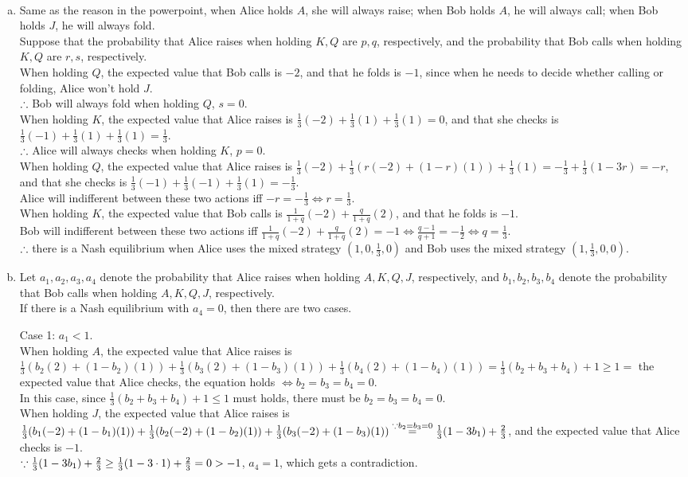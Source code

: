 \begin{pr}$ $
\begin{enumerate}[(a)]
\item Same as the reason in the powerpoint, when Alice holds $A$, she will always raise; when Bob holds $A$, he will always call; when Bob holds $J$, he will always fold.\\
Suppose that the probability that Alice raises when holding $K, Q$ are $p, q$, respectively, and the probability that Bob calls when holding $K, Q$ are $r, s$, respectively.\\
When holding $Q$, the expected value that Bob calls is $-2$, and that he folds is $-1$, since when he needs to decide whether calling or folding, Alice won't hold $J$.\\
$\therefore$ Bob will always fold when holding $Q$, $s=0$.\\
When holding $K$, the expected value that Alice raises is $\frac13(-2)+\frac13(1)+\frac13(1)=0$, and that she checks is $\frac13(-1)+\frac13(1)+\frac13(1)=\frac13$.\\
$\therefore$ Alice will always checks when holding $K$, $p=0$.\\
When holding $Q$, the expected value that Alice raises is $\frac13(-2)+\frac13(r(-2)+(1-r)(1))+\frac13(1)=-\frac13+\frac13(1-3r)=-r$, and that she checks is $\frac13(-1)+\frac13(-1)+\frac13(1)=-\frac13$.\\
Alice will indifferent between these two actions iff $-r=-\frac13\iff r=\frac13$.\\
When holding $K$, the expected value that Bob calls is $\frac1{1+q}(-2)+\frac q{1+q}(2)$, and that he folds is $-1$.\\
Bob will indifferent between these two actions iff $\frac1{1+q}(-2)+\frac q{1+q}(2)=-1\iff\frac{q-1}{q+1}=-\frac12\iff q=\frac13$.\\
$\therefore$ there is a Nash equilibrium when Alice uses the mixed strategy $(1, 0, \frac13, 0)$ and Bob uses the mixed strategy $(1, \frac13, 0, 0)$.
\item Let $a_1, a_2, a_3, a_4$ denote the probability that Alice raises when holding $A, K, Q, J$, respectively, and $b_1, b_2, b_3, b_4$ denote the probability that Bob calls when holding $A, K, Q, J$, respectively.\\
If there is a Nash equilibrium with $a_4=0$, then there are two cases.

Case 1: $a_1<1$.\\
When holding $A$, the expected value that Alice raises is $\frac13(b_2(2)+(1-b_2)(1))+\frac13(b_3(2)+(1-b_3)(1))+\frac13(b_4(2)+(1-b_4)(1))=\frac13(b_2+b_3+b_4)+1\geq1=$ the expected value that Alice checks, the equation holds $\iff b_2=b_3=b_4=0$.\\
In this case, since $\frac13(b_2+b_3+b_4)+1\leq1$ must holds, there must be $b_2=b_3=b_4=0$.\\
When holding $J$, the expected value that Alice raises is $\frac13(b_1(-2)+(1-b_1)(1))+\frac13(b_2(-2)+(1-b_2)(1))+\frac13(b_3(-2)+(1-b_3)(1))\overset{\because b_2=b_3=0}=\frac13(1-3b_1)+\frac23$, and the expected value that Alice checks is $-1$.\\
$\because\frac13(1-3b_1)+\frac23\geq\frac13(1-3\cdot1)+\frac23=0>-1$, $a_4=1$, which gets a contradiction.


\end{enumerate}
\end{pr}
